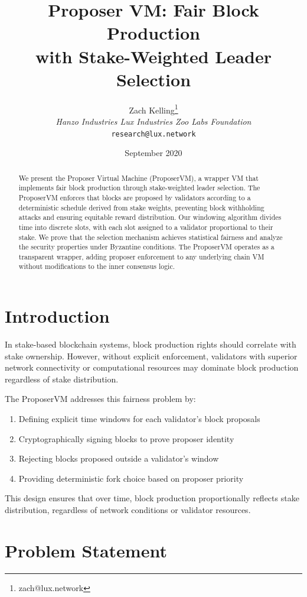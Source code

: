 \documentclass[11pt,letterpaper]{article}
\title{Proposer VM: Fair Block Production\\with Stake-Weighted Leader Selection}
\author{Zach Kelling\thanks{zach@lux.network} \\ \textit{Hanzo Industries \quad Lux Industries \quad Zoo Labs Foundation} \\ \texttt{research@lux.network}}
\date{September 2020}
\begin{document}
\maketitle

\begin{abstract}
We present the Proposer Virtual Machine (ProposerVM), a wrapper VM that implements fair block production through stake-weighted leader selection. The ProposerVM enforces that blocks are proposed by validators according to a deterministic schedule derived from stake weights, preventing block withholding attacks and ensuring equitable reward distribution. Our windowing algorithm divides time into discrete slots, with each slot assigned to a validator proportional to their stake. We prove that the selection mechanism achieves statistical fairness and analyze the security properties under Byzantine conditions. The ProposerVM operates as a transparent wrapper, adding proposer enforcement to any underlying chain VM without modifications to the inner consensus logic.
\end{abstract}

\section{Introduction}

In stake-based blockchain systems, block production rights should correlate with stake ownership. However, without explicit enforcement, validators with superior network connectivity or computational resources may dominate block production regardless of stake distribution.

The ProposerVM addresses this fairness problem by:
\begin{enumerate}
    \item Defining explicit time windows for each validator's block proposals
    \item Cryptographically signing blocks to prove proposer identity
    \item Rejecting blocks proposed outside a validator's window
    \item Providing deterministic fork choice based on proposer priority
\end{enumerate}

This design ensures that over time, block production proportionally reflects stake distribution, regardless of network conditions or validator resources.

\section{Problem Statement}
\end{document}
